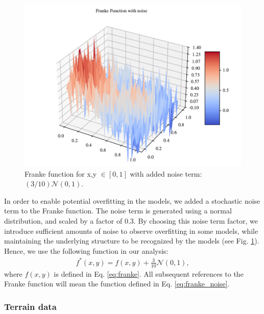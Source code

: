 \begin{figure}[h!]
\centering
\includegraphics[width=1\linewidth]{project_1_alt/figures/data/franke_func_noise.pdf}
\caption{Franke function for x,y $\in [0,1]$ with added noise term: $(3/10) \mathcal{N}(0, 1)$.}
\label{fig:franke_noise}
\end{figure}

In order to enable potential overfitting in the models, we added a stochastic noise term to the Franke function. The noise term is generated using a normal distribution, and scaled by a factor of $0.3$. By choosing this noise term factor, we introduce sufficient amounts of noise to observe overfitting in some models, while maintaining the underlying structure to be recognized by the models (see Fig. \ref{fig:franke_noise}). Hence, we use the following function in our analysis:
\begin{align}\label{eq:franke_noise}
    f^*(x,y) = f(x, y) + \frac{3}{10} \mathcal{N}(0, 1),
\end{align}
where $f(x,y)$ is defined in Eq. \ref{eq:franke}. All subsequent references to the Franke function will mean the function defined in Eq. \ref{eq:franke_noise}.

\subsubsection{Terrain data}

